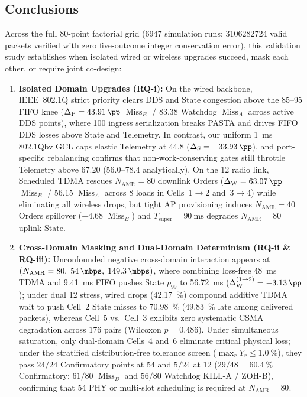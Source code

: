 \documentclass[11pt,a4paper]{article}
\newcommand{\Namr}{\ensuremath{N_{\mathrm{AMR}}}}
\newcommand{\Tsuper}{\ensuremath{T_{\mathrm{super}}}}
\newcommand{\MissA}{\ensuremath{\operatorname{Miss}_A}}
\newcommand{\MissB}{\ensuremath{\operatorname{Miss}_B}}
\newcommand{\GainP}{\ensuremath{\Delta_{\mathrm{P}}}}
\newcommand{\GainS}{\ensuremath{\Delta_{\mathrm{S}}}}
\newcommand{\GainW}{\ensuremath{\Delta_{\mathrm{W}}}}
\newcommand{\GainWpair}{\ensuremath{\Delta_{\mathrm{W}}^{(1\to 2)}}}
\begin{document}
\subsection{Conclusions}
\label{sec:conclusions_sub}

Across the full $80$-point factorial grid (\num{6947} simulation runs; \num{3106282724} valid packets verified with zero five-outcome integer conservation error), this validation study establishes when isolated wired or wireless upgrades succeed, mask each other, or require joint co-design:

\begin{enumerate}[leftmargin=1.8em]
    \item \textbf{Isolated Domain Upgrades (RQ-i):} On the wired backbone, IEEE~802.1Q strict priority clears DDS and State congestion above the \qtyrange{85}{95}{\mbps} FIFO knee ($\GainP = \qty{+43.91}{\pp}$ $\MissB$ / \qty{+83.38}{\pp} Watchdog $\MissA$ across active DDS points), where \qty{100}{\mbps} ingress serialization breaks PASTA and drives FIFO DDS losses above State and Telemetry. In contrast, our uniform \qty{1}{\milli\second} 802.1Qbv GCL caps elastic Telemetry at \qty{44.8}{\mbps} ($\GainS = \qty{-33.93}{\pp}$), and port-specific rebalancing confirms that non-work-conserving gates still throttle Telemetry above \qty{67.20}{\mbps} (\qtyrange{56.0}{78.4}{\mbps} analytically). On the \qty{12}{\mbps} radio link, Scheduled TDMA rescues $\Namr=80$ downlink Orders ($\GainW = \qty{+63.07}{\pp}$ $\MissB$ / \qty{+56.15}{\pp} $\MissA$ across 8 loads in Cells~1$\to$2 and~3$\to$4) while eliminating all wireless drops, but tight AP provisioning induces $\Namr=40$ Orders spillover (\qty{-4.68}{\pp} $\MissB$) and $\Tsuper=\qty{90}{\milli\second}$ degrades $\Namr=80$ uplink State.
    \item \textbf{Cross-Domain Masking and Dual-Domain Determinism (RQ-ii \& RQ-iii):} Unconfounded negative cross-domain interaction appears at $(\Namr=80,\; \qty{54}{\mbps},\; \qty{149.3}{\mbps})$, where combining loss-free \qty{48}{\milli\second} TDMA and \qty{9.41}{\milli\second} FIFO pushes State $p_{99}$ to \qty{56.72}{\milli\second} ($\GainWpair = \qty{-3.13}{\pp}$); under dual \qty{12}{\mbps} stress, wired drops (\qty{42.17}{\percent}) compound additive TDMA wait to push Cell~2 State misses to \qty{70.98}{\percent} (\qty{49.83}{\percent} late among delivered packets), whereas Cell~5 vs.\ Cell~3 exhibits zero systematic CSMA degradation across $176$ pairs (Wilcoxon $p=0.486$). Under simultaneous saturation, only dual-domain Cells~4 and~6 eliminate critical physical loss; under the stratified distribution-free tolerance screen ($\max_r Y_r \le \qty{1.0}{\percent}$), they pass $24/24$ Confirmatory points at \qty{54}{\mbps} and $5/24$ at \qty{12}{\mbps} ($29/48 = \qty{60.4}{\percent}$ Confirmatory; $61/80$ $\MissB$ and $56/80$ Watchdog KILL-A / ZOH-B), confirming that \qty{54}{\mbps} PHY or multi-slot scheduling is required at $\Namr=80$.

\end{enumerate}
\end{document}
